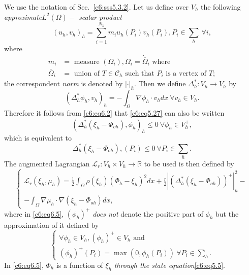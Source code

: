  We use the notation of Sec.~\ref{c6:sss5.3.2}. Let us define over 
 $V_h$ the following \textit{approximate\pageoriginale  $L^2 (\Omega)-$ scalar 
 product}   
 \begin{equation}
(u_h, v_h)_h = \sum^{N_h}_{i=1} m_i u_h (P_i) v_h (P_i), P_i \in 
\textstyle{\sum_h} ~ \forall i, \tag{6.1}\label{c6:eq6.1}  
 \end{equation} 
 where 
 \begin{align*}
m_i & = \text{ measure } (\Omega_i), \Omega_i = 
\dot{\overline{\Omega}}_i \text{ where }\\ 
\overline{\Omega}_i & = \text{ union of } T \in \mathscr{C}_h \text{ such  
that } P_i \text{ is a vertex of } T; 
 \end{align*} 
 the correspondent \textit{norm} is denoted by $|\cdot|_h$. Then we 
 define $\Delta^*_h : V_h \to V_h$ by  
 \begin{equation}
(\Delta^*_h \phi_h, v_h)_h = - \int_\Omega \nabla \phi_h \cdot 
v_h dx ~ \forall v_h \in V_h. \tag{6.2}\label{c6:eq6.2} 
 \end{equation} 
 Therefore it follows from \eqref{c6:eq6.2} that \eqref{c6:eq5.27} can 
 also be written 
 \begin{equation}
(\Delta^*_h (\xi_h - \Phi_{oh}), \phi_h)_h \leq 0 ~ \forall \phi_h 
\in V^+_h, \tag{6.3}\label{c6:eq6.3} 
 \end{equation}
 which is equivalent to 
 \begin{equation} 
 \Delta^*_h (\xi_h - \Phi_{oh}), (P_i) \leq 0 ~ \forall P_i \in 
 \sum_h. \tag{6.4}\label{c6:eq6.4} 
 \end{equation}
 The augmented Lagrangian $\mathscr{L}_r : V_h \times V_h \to 
 \mathbb{R}$ to be used is then defined by 
 \begin{equation}
\begin{cases}
\mathscr{L}_r (\xi_h, \mu_h) = \frac{1}{2} \int_\Omega \rho (\xi_h) 
(\Phi_h - \xi_h)^2 dx + \frac{r}{2} |(\Delta^*_h (\xi_h - \Phi_{oh}))^+ |^2_h-\\ 
- \int_\Omega \nabla \mu_h \cdot \nabla (\xi_h - \Phi_{oh}) dx,
\end{cases}
\tag{6.5}\label{c6:eq6.5}
 \end{equation} 
 where in \eqref{c6:eq6.5}, $(\phi_h)^+$ \textit{does not} denote the 
 positive part of $\phi_h$ but the approximation of it defined by  
 \begin{equation} 
\begin{cases}
\forall \phi_h \in V_h, (\phi_h)^+ \in V_h \text{ and }\\
(\phi_h)^+ (P_i) = \max (0, \phi_h (P_i))~ \forall P_i \in \sum_h. 
 \end{cases}
 \tag{6.6}\label{c6:eq6.6}
 \end{equation} 
 In \eqref{c6:eq6.5}, $\Phi_h$ is a function of $\xi_h$ \textit{through 
 the state equation}\eqref{c6:eq5.5}. 
 
